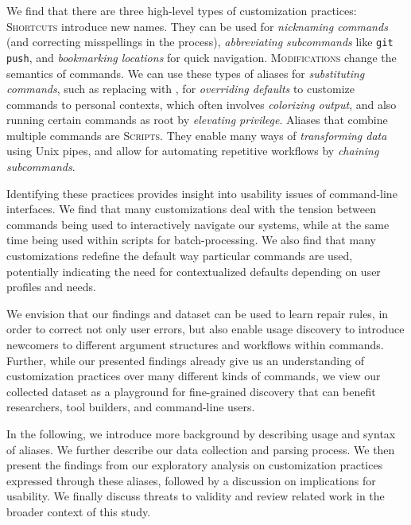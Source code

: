 We find that there are three high-level types of customization practices:
\textsc{Shortcuts} introduce new names.
They can be used for \emph{nicknaming commands} (and correcting misspellings in the process),
\emph{abbreviating subcommands} like \texttt{git push},
and \emph{bookmarking locations} for quick navigation.
\textsc{Modifications} change the semantics of commands.
We can use these types of aliases for \emph{substituting commands}, such as replacing  with ,
for \emph{overriding defaults} to customize commands to personal contexts, 
which often involves \emph{colorizing output},
and also running certain commands as root by \emph{elevating privilege}.
Aliases that combine multiple commands are \textsc{Scripts}.
They enable many ways of \emph{transforming data} using Unix pipes, 
and allow for automating repetitive workflows by \emph{chaining subcommands}.

Identifying these practices provides insight into usability issues of command-line interfaces.
We find that many customizations deal with the tension between commands being used to interactively navigate our systems, while at the same time being used within scripts for batch-processing.
We also find that many customizations redefine the default way particular commands are used, potentially indicating the need for contextualized defaults depending on user profiles and needs. 

We envision that our findings and dataset can be used to learn repair rules, in order to correct not only user errors, but also enable usage discovery to introduce newcomers to different argument structures and workflows within commands.
Further, while our presented findings already give us an understanding of customization practices over many different kinds of commands, we view our collected dataset as a playground for fine-grained discovery that can benefit researchers, tool builders, and command-line users.

In the following, we introduce more background by describing usage and syntax of aliases. We further describe our data collection and parsing process. We then present the findings from our exploratory analysis on customization practices expressed through these aliases, followed by a discussion on implications for usability. We finally discuss threats to validity and review related work in the broader context of this study. 